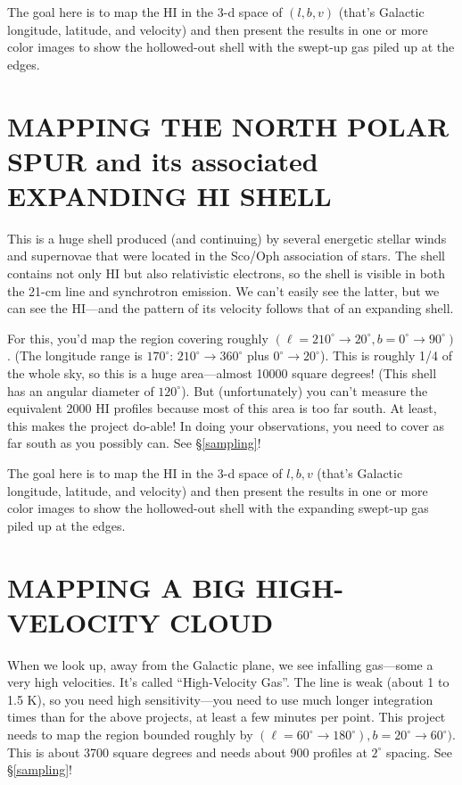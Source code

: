 \documentclass[psfig,preprint]{aastex}
\begin{document}
The goal here is to map the HI in the 3-d space of $(l, b, v)$ (that's
Galactic longitude, latitude, and velocity) and then present the results
in one or more color images to show the hollowed-out shell with the
swept-up gas piled up at the edges.

\section{MAPPING THE NORTH POLAR SPUR and its associated EXPANDING HI SHELL}

This is a huge shell produced (and continuing) by several energetic
stellar winds and supernovae that were located in the Sco/Oph
association of stars. The shell contains not only HI but also
relativistic electrons, so the shell is visible in both the 21-cm line
and synchrotron emission. We can't easily see the latter, but we can see
the HI---and the pattern of its velocity follows that of an expanding
shell.

For this, you'd map the region covering roughly $(\ell=210^\circ
\rightarrow 20^\circ, b=0^\circ \rightarrow 90^\circ)$. (The longitude
range is $170^\circ$: $210^\circ \rightarrow 360^\circ$ plus $0^\circ
\rightarrow 20^\circ$). This is roughly 1/4 of the whole sky, so this is
a huge area---almost 10000 square degrees! (This shell has an angular
diameter of $120^\circ$). But (unfortunately) you can't measure the
equivalent 2000 HI profiles because most of this area is too far
south. At least, this makes the project do-able! In doing your
observations, you need to cover as far south as you possibly can. See
\S \ref{sampling}!

The goal here is to map the HI in the 3-d space of ${l, b, v}$ (that's
Galactic longitude, latitude, and velocity) and then present the results
in one or more color images to show the hollowed-out shell with the
expanding swept-up gas piled up at the edges.

\section{MAPPING A BIG HIGH-VELOCITY CLOUD}

When we look up, away from the Galactic plane, we see infalling
gas---some a very high velocities. It's called ``High-Velocity Gas''.
The line is weak (about 1 to 1.5 K), so you need high sensitivity---you
need to use much longer integration times than for the above projects,
at least a few minutes per point.  This project needs to map the region
bounded roughly by $(\ell=60^\circ \rightarrow 180^\circ), b=20^\circ
\rightarrow 60^\circ)$. This is about 3700 square degrees and needs
about 900 profiles at $2^\circ$ spacing. See
\S \ref{sampling}!
\end{document}

